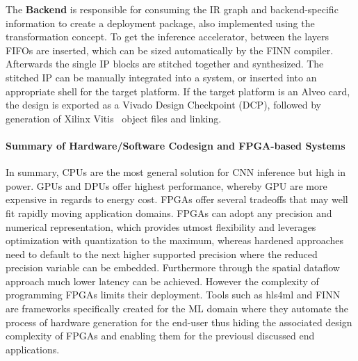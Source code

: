 The \textbf{Backend} is responsible for consuming the IR graph and backend-specific information to create a deployment package, also implemented using the transformation concept.
To get the inference accelerator, between the layers FIFOs are inserted, which can be sized automatically by the FINN compiler. Afterwards the single IP blocks are stitched together and synthesized. The stitched IP can be manually integrated into a system, or inserted into an appropriate shell for the target platform. If the target platform is an Alveo card, the design is exported as a Vivado Design Checkpoint (DCP), followed by generation of Xilinx Vitis~\cite{kathail2020xilinx} object files and linking.


\paragraph*{Summary of Hardware/Software Codesign and FPGA-based Systems}
In summary, CPUs are the most general solution for CNN inference but high in power. GPUs and DPUs offer highest performance, whereby GPU are more expensive in regards to energy cost. FPGAs offer several tradeoffs that may well fit rapidly moving application domains. %
FPGAs can adopt any precision and numerical representation, which provides utmost flexibility and leverages optimization with quantization to the maximum, whereas hardened approaches need to default to the next higher supported precision where the reduced precision variable can be embedded.
Furthermore through the spatial dataflow approach much lower latency can be achieved.
However the complexity of programming FPGAs limits their deployment.
Tools such as hls4ml and FINN are frameworks specifically created for the ML domain where they automate the process of hardware generation for the end-user thus hiding the associated design complexity of FPGAs and enabling them for the previousl discussed end applications.


